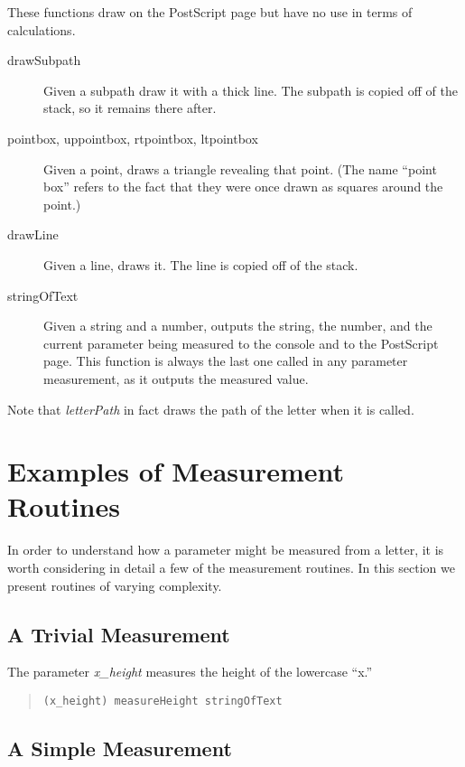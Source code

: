\documentclass[12pt]{article}
\begin{document}
These functions draw on the PostScript page but have no use in terms of
calculations.

\begin{description}

\item[drawSubpath] Given a subpath draw it with a thick line. The subpath is
copied off of the stack, so it remains there after.

\item[pointbox, uppointbox, rtpointbox, ltpointbox] Given a point, draws a
triangle revealing that point. (The name ``point box'' refers to the fact that
they were once drawn as squares around the point.)

\item[drawLine] Given a line, draws it. The line is copied off of the stack.

\item[stringOfText] Given a string and a number, outputs the string, the number,
and the current parameter being measured to the console and to the PostScript
page. This function is always the last one called in any parameter measurement,
as it outputs the measured value.
\end{description}

Note that \emph{letterPath} in fact draws the path of the letter when it is
called.

\section{Examples of Measurement Routines}

In order to understand how a parameter might be measured from a letter, it is
worth considering in detail a few of the measurement routines. In this section
we present routines of varying complexity.

\subsection{A Trivial Measurement}

The parameter \emph{x\_height} measures the height of the lowercase ``x.''

\begin{quote}
\begin{verbatim}
(x_height) measureHeight stringOfText
\end{verbatim}
\end{quote}

\subsection{A Simple Measurement}
\end{document}
